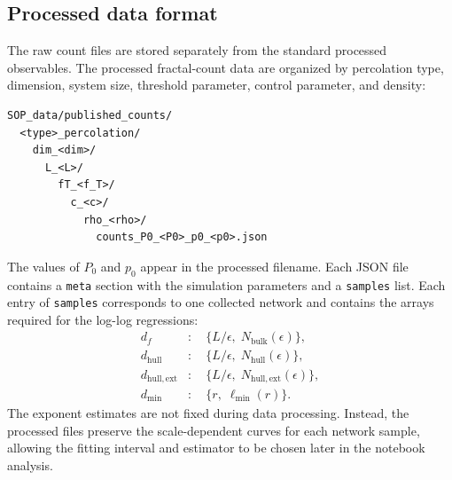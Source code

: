 \subsection{Processed data format}
\label{subsec:processed-counts-format}

The raw count files are stored separately from the standard processed
observables.  The processed fractal-count data are organized by percolation
type, dimension, system size, threshold parameter, control parameter, and
density:
\begin{verbatim}
SOP_data/published_counts/
  <type>_percolation/
    dim_<dim>/
      L_<L>/
        fT_<f_T>/
          c_<c>/
            rho_<rho>/
              counts_P0_<P0>_p0_<p0>.json
\end{verbatim}
The values of \(P_0\) and \(p_0\) appear in the processed filename.  Each JSON
file contains a \texttt{meta} section with the simulation parameters and a
\texttt{samples} list.  Each entry of \texttt{samples} corresponds to one
collected network and contains the arrays required for the log-log regressions:
\begin{align*}
    d_f &: \quad
    \{L/\epsilon,\; N_{\mathrm{bulk}}(\epsilon)\},
    \\
    d_{\mathrm{hull}} &: \quad
    \{L/\epsilon,\; N_{\mathrm{hull}}(\epsilon)\},
    \\
    d_{\mathrm{hull,ext}} &: \quad
    \{L/\epsilon,\; N_{\mathrm{hull,ext}}(\epsilon)\},
    \\
    d_{\min} &: \quad
    \{r,\; \ell_{\min}(r)\}.
\end{align*}
The exponent estimates are not fixed during data processing.  Instead, the
processed files preserve the scale-dependent curves for each network sample,
allowing the fitting interval and estimator to be chosen later in the notebook
analysis.
